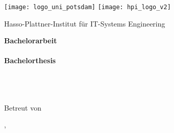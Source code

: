 \begin{titlepage}

\centering
\sffamily

\texttt{[image: logo\_uni\_potsdam]}
\hspace{2.5cm}
\texttt{[image: hpi\_logo\_v2]}
\vspace*{0.75cm}

\textsf{\Large Hasso-Plattner-Institut f\"ur IT-Systems Engineering}\\

\vspace{2cm}

\LARGE
\textbf{Bachelorarbeit}\\[0.2\baselineskip]
\LARGE
\textbf{\docTitle}\\[0.6\baselineskip]
\LARGE
\textbf{Bachelorthesis}\\[0.2\baselineskip]
\LARGE
\textbf{\docTitleEng}\\[0.6\baselineskip]
\Large
\docAuthor\\[0.5\baselineskip]
{\normalsize \docAuthorMail}\\

\vfill

\large
Betreut von \docSupervisited
\\[1.0\baselineskip]
\docChair

\vspace{1cm}
\textsf{\docCity{}, \docDate}\\ %
\end{titlepage}
